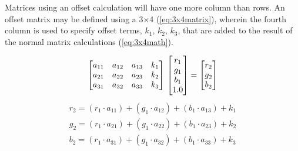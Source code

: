 Matrices using an offset calculation will have one more column than rows. An offset matrix may be defined using a 3$\times$4  (\ref{eq:3x4matrix}), wherein the fourth column is used to specify offset terms, $k_1$, $k_2$, $k_3$, that are added to the result of the normal matrix calculations (\ref{eq:3x4math}). 

\begin{equation} \label{eq:3x4matrix}
    \begin{bmatrix*}
        a_{11} & a_{12} & a_{13} & k_1\\
        a_{21} & a_{22} & a_{23} & k_2\\
        a_{31} & a_{32} & a_{33} & k_3\\
    \end{bmatrix*} \\
    \begin{bmatrix}
        r_1\\
        g_1\\
        b_1\\
        1.0
    \end{bmatrix}
    =
    \begin{bmatrix}
        r_2\\
        g_2\\
        b_2
    \end{bmatrix}
\end{equation}
\begin{equation} \label{eq:3x4math}
    \begin{aligned}
    r_2 = (r_1 \cdot a_{11}) + (g_1 \cdot a_{12}) + (b_1 \cdot a_{13}) + k_1\\
    g_2 = (r_1 \cdot a_{21}) + (g_1 \cdot a_{22}) + (b_1 \cdot a_{23}) + k_2\\
    b_2 = (r_1 \cdot a_{31}) + (g_1 \cdot a_{32}) + (b_1 \cdot a_{33}) + k_3
    \end{aligned}    
\end{equation}

